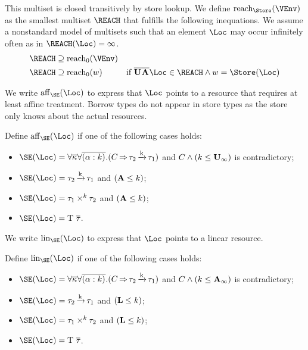This multiset is closed transitively by store lookup. We define 
$\Reach\Store\VEnv$ as the smallest multiset $\REACH$ that fulfills
the following inequations. We assume a nonstandard
model of multisets such that an element $\Loc$ may occur infinitely often as in
$\MultiNumber\Loc\REACH = \infty$. 
\begin{align*}
  \REACH &\supseteq \RS\Store\VEnv \\
  \REACH &\supseteq \RS\Store w & \text{if }
                                     \Multi\IBORROW\Multi\MBORROW\Loc
                                     \in \REACH \wedge w = \Store (\Loc)
\end{align*}

We write $\Affine\SE\Loc$ to express that $\Loc$ points to a resource
that requires at least affine treatment. Borrow types do not appear in
store types as the store only knows about the actual resources.

Define  $\Affine\SE\Loc$ if one of the following cases holds:
\begin{itemize}
\item $\SE (\Loc) =
  \forall\Multi\kvar\forall\Multi{\bvar{\tvar}{k}}.(\qual{C}{\tau_2\tarr{k}\tau_1})$
  and $C \wedge (k \leq \mathbf{U}_\infty)$ is contradictory;
\item $\SE (\Loc) = \tau_2\tarr{k}{\tau_1}$ and $(\mathbf{A} \leq k)$;
\item $\SE (\Loc) = \tyPair[k]{\tau_1}{\tau_2}$ and $(\mathbf{A} \leq k)$;
\item $\SE (\Loc) = \tapp{\tcon}{\Multi\tau}$.
\end{itemize}

We write $\Linear\SE\Loc$ to express that $\Loc$ points to a linear
resource.

Define  $\Linear\SE\Loc$ if one of the following cases holds:
\begin{itemize}
\item $\SE (\Loc) =
  \forall\Multi\kvar\forall\Multi{\bvar{\tvar}{k}}.(\qual{C}{\tau_2\tarr{k}\tau_1})$
  and $C \wedge (k \leq \mathbf{A}_\infty)$ is contradictory; 
\item $\SE (\Loc) = \tau_2\tarr{k}{\tau_1}$ and $(\mathbf{L} \leq k)$;
\item $\SE (\Loc) = \tyPair[k]{\tau_1}{\tau_2}$ and $(\mathbf{L} \leq k)$;
\item $\SE (\Loc) = \tapp{\tcon}{\Multi\tau}$.
\end{itemize}

